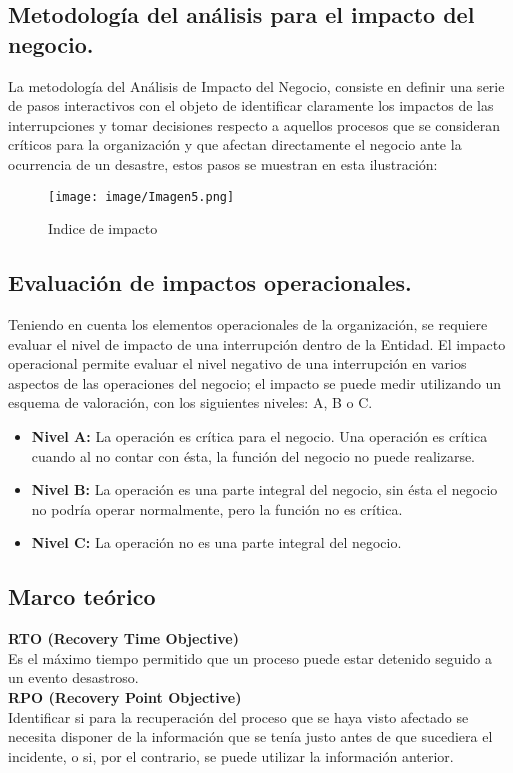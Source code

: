 \documentclass[conference]{IEEEtran}
\begin{document}
\subsection{Metodología del análisis para el impacto del negocio.}

La metodología del Análisis de Impacto del Negocio, consiste en definir una serie
de pasos interactivos con el objeto de identificar claramente los impactos de las
interrupciones y tomar decisiones respecto a aquellos procesos que se consideran
críticos para la organización y que afectan directamente el negocio ante la
ocurrencia de un desastre, estos pasos se muestran en esta ilustración:

\begin{figure}[htbp]
    \begin{center}
    \texttt{[image: image/Imagen5.png]}
    \caption{Indice de impacto}
\label{fig0}
    \end{center}
\end{figure} 

\subsection{Evaluación de impactos operacionales.}

Teniendo en cuenta los elementos operacionales de la organización, se requiere
evaluar el nivel de impacto de una interrupción dentro de la Entidad.
El impacto operacional permite evaluar el nivel negativo de una interrupción en
varios aspectos de las operaciones del negocio; el impacto se puede medir
utilizando un esquema de valoración, con los siguientes niveles: A, B o C.

\begin{itemize}
    \item \textbf{Nivel A:} La operación es crítica para el negocio. Una operación es crítica cuando al no contar con ésta, la función del negocio no puede realizarse.
    \item \textbf{Nivel B:} La operación es una parte integral del negocio, sin ésta el negocio no podría operar normalmente, pero la función no es crítica.
    \item \textbf{Nivel C:} La operación no es una parte integral del negocio.
\end{itemize}

\subsection{Marco teórico}
\textbf{RTO (Recovery Time Objective)}
\\
Es el máximo tiempo   permitido   que   un   proceso   puede   estar   detenido seguido a un evento desastroso. 
\\
\textbf{RPO  (Recovery  Point  Objective)}\\
Identificar  si  para la recuperación del proceso que se haya visto afectado  se  necesita  disponer  de  la  información  que   se   tenía   justo   antes   de   que   sucediera   el   incidente, o si, por el contrario, se puede utilizar la información anterior.
\end{document}
